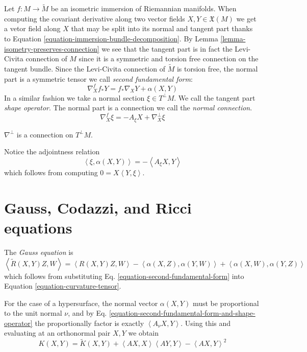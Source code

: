 Let $f:M \to \tilde{M}$ be an isometric immersion of Riemannian manifolds. When
computing the covariant derivative along two vector fields 
$X,Y \in\mathfrak{X}(M)$ we get a vetor field along $X$ that may be split into
its normal and tangent part thanks to Equation 
\ref{equation-immersion-bundle-decomposition}. By Lemma
\ref{lemma-isometry-preserves-connection} we see that the tangent part is
in fact the Levi-Civita connection of $M$ since it is a symmetric and torsion
free connection on the tangent bundle. Since the Levi-Civita connection of
$\tilde{M}$ is torsion free, the normal part is a
symmetric tensor we call {\it second fundamental form}:
\begin{equation}
\label{equation-second-fundamental-form}
\nabla^{f}_X f_*Y=f_*\nabla_XY+\alpha(X,Y)
\end{equation}
In a similar fashion we take a normal section $\xi\in T^\perp M$. 
We call the tangent part {\it shape operator}. The normal part is a connection 
we call the {\it normal connection}.
\begin{equation}
\label{equation-shape-operator}
\nabla^f_X\xi=-A_\xi X+\nabla^\perp_X\xi
\end{equation}
\begin{lemma}
\label{lemma-normal-connection}
$\nabla^\perp$ is a connection on $T^\perp M$.
\end{lemma}
Notice the adjointness relation
\begin{equation}
\label{equation-second-fundamental-form-and-shape-operator}
\left<\xi,\alpha(X,Y)\right>=-\left<A_\xi X,Y\right>
\end{equation}
which follows from computing $0=X\left<Y,\xi\right>$.

\section{Gauss, Codazzi, and Ricci equations}
\label{section-Gauss-Codazzi-Ricci}

The {\it Gauss equation} is
\begin{equation}
\label{equation-Gauss}
\left<\tilde{R}(X,Y)Z,W\right>=\left<R(X,Y)Z,W\right>
-\left<\alpha(X,Z),\alpha(Y,W)\right>+\left<\alpha(X,W),\alpha(Y,Z)\right>
\end{equation}
which follows from substituting Eq. \ref{equation-second-fundamental-form} 
into Equation \ref{equation-curvature-tensor}.

For the case of a hypersurface, the normal vector $\alpha(X,Y)$ must be
proportional to the unit normal $\nu$, and by Eq.
\ref{equation-second-fundamental-form-and-shape-operator} the proportionally
factor is exactly $\left<A_\nu X,Y\right>$. Using this and evaluating
 at an orthonormal pair $X,Y$ we obtain
\begin{equation}
\label{equation-Gauss-hypersurface}
K(X,Y)=\tilde{K}(X,Y)+\left<AX,X\right>\left<AY,Y\right>-\left<AX,Y\right>^2
\end{equation}

